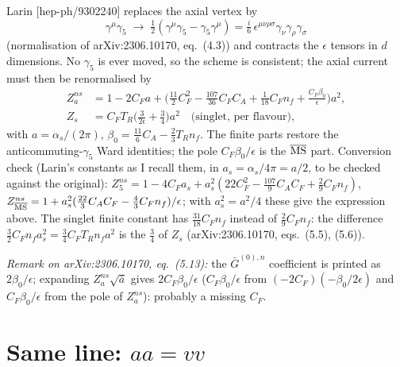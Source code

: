 \documentclass[11pt,a4paper]{article}
\newcommand{\ep}{\epsilon}
\newcommand{\gf}{\gamma_5}
\begin{document}
Larin [hep-ph/9302240] replaces the axial vertex by
\begin{equation}
\gamma^\mu\gf\;\to\;\tfrac12(\gamma^\mu\gf-\gf\gamma^\mu)=\tfrac{i}{6}\,\epsilon^{\mu\nu\rho\sigma}\gamma_\nu\gamma_\rho\gamma_\sigma
\end{equation}
(normalisation of arXiv:2306.10170, eq.~(4.3)) and contracts the $\epsilon$ tensors in $d$ dimensions. No $\gf$ is ever
moved, so the scheme is consistent; the axial current must then be renormalised by
\begin{align}
Z_a^{ns}&=1-2C_Fa+\Big(\tfrac{11}{2}C_F^2-\tfrac{107}{36}C_FC_A+\tfrac1{18}C_Fn_f+\frac{C_F\beta_0}{\ep}\Big)a^2,\\
Z_s&=C_FT_R\Big(\frac{3}{2\ep}+\frac34\Big)a^2\quad\text{(singlet, per flavour)},
\end{align}
with $a=\alpha_s/(2\pi)$, $\beta_0=\tfrac{11}{6}C_A-\tfrac23T_Rn_f$. The finite parts restore the anticommuting-$\gf$ Ward
identities; the pole $C_F\beta_0/\ep$ is the $\overline{\rm MS}$ part. Conversion check (Larin's constants as I recall
them, in $a_s=\alpha_s/4\pi=a/2$, to be checked against the original): $Z_5^{ns}=1-4C_Fa_s+a_s^2(22C_F^2-\tfrac{107}9C_AC_F+\tfrac29C_Fn_f)$,
$Z^{ns}_{\overline{\rm MS}}=1+a_s^2(\tfrac{22}3C_AC_F-\tfrac43C_Fn_f)/\ep$; with $a_s^2=a^2/4$ these give the
expression above. The singlet finite constant has $\tfrac{31}{18}C_Fn_f$ instead of $\tfrac29C_Fn_f$: the difference
$\tfrac32C_Fn_fa_s^2=\tfrac34C_FT_Rn_fa^2$ is the $\tfrac34$ of $Z_s$ (arXiv:2306.10170, eqs.~(5.5), (5.6)).

\emph{Remark on arXiv:2306.10170, eq.~(5.13):} the $\bar G^{(0),n}$ coefficient is printed as $2\beta_0/\ep$; expanding
$Z_a^{ns}\sqrt{\bar a}$ gives $2C_F\beta_0/\ep$ ($C_F\beta_0/\ep$ from $(-2C_F)(-\beta_0/2\ep)$ and $C_F\beta_0/\ep$ from the
pole of $Z_a^{ns}$): probably a missing $C_F$.

\section{Same line: \texorpdfstring{$aa=vv$}{aa = vv}}\label{sec:same}
\end{document}

